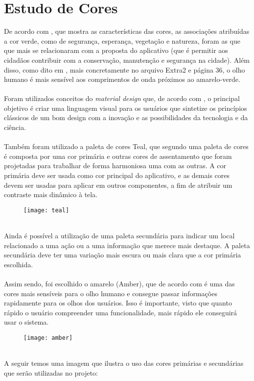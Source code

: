 \documentclass[a4paper,12pt,twoside]{report}
\begin{document}
\chapter{Estudo de Cores}
De acordo com \cite{R0}, que mostra as características das cores, as associações atribuídas a cor verde, como de segurança, esperança, vegetação e natureza, foram as que que mais se relacionaram com a proposta do aplicativo (que é permitir aos cidadãos contribuir com a conservação, manutenção e segurança na cidade). Além disso, como dito em \cite{R0}, mais concretamente no arquivo Extra2 e página 36, o olho humano é mais sensível aos comprimentos de onda próximos ao amarelo-verde.
\\~\\
Foram utilizados conceitos do \textit{material design} que, de acordo com \cite{R3}, o principal objetivo é criar uma linguagem visual para os usuários que sintetize os princípios clássicos de um bom design com a inovação e as possibilidades da tecnologia e da ciência.
\\~\\
Também foram utilizado a paleta de cores Teal, que segundo \cite{R3} uma paleta de cores é composta por uma cor primária e outras cores de assentamento que foram projetadas para trabalhar de forma harmoniosa uma com as outras. A cor primária deve ser usada como cor principal do aplicativo, e as demais cores devem ser usadas para aplicar em outros componentes, a fim de atribuir um contraste mais dinâmico à tela.

\begin{figure}[!ht]
\centering
\texttt{[image: teal]}
\end{figure}
\ \\
Ainda é possível a utilização de uma paleta secundária para indicar um local relacionado a uma ação ou a uma informação que merece mais destaque. A paleta secundária deve ter uma variação mais escura ou mais clara que a cor primária escolhida.
\\~\\
Assim sendo, foi escolhido o amarelo (Amber), que de acordo com \cite{R0} é uma das cores mais sensíveis para o olho humano e consegue passar informações rapidamente para os olhos dos usuários. Isso é importante, visto que quanto rápido o usuário compreender uma funcionalidade, mais rápido ele conseguirá usar o sistema.

\begin{figure}[!ht]
\centering
\texttt{[image: amber]}
\end{figure}
\ \\
A seguir temos uma imagem que ilustra o uso das cores primárias e secundárias que serão
utilizadas no projeto:
\end{document}

